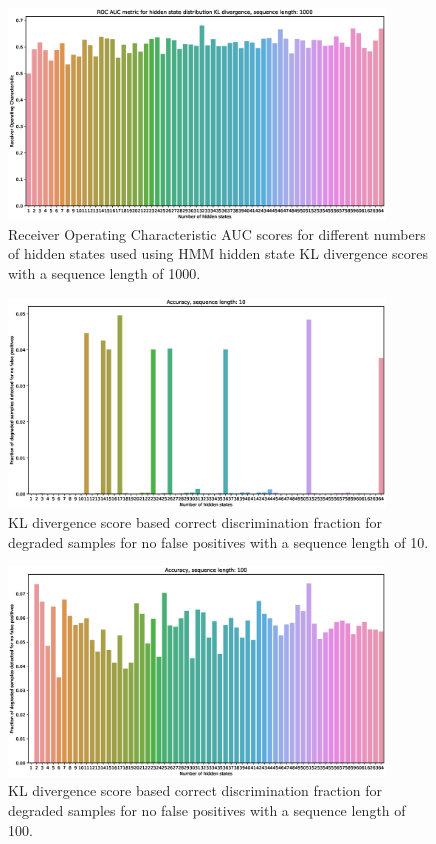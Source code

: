 \documentclass[journal]{IEEEtran}
\begin{document}
\begin{figure}[h]
 \centering
 \includegraphics[width=10cm,keepaspectratio=true]{./roc_kl_score_1000.eps}
 \caption{Receiver Operating Characteristic AUC scores for different numbers of hidden states used using HMM hidden state KL divergence scores with a sequence length of 1000.}
 \label{figure:roc_kl_1000}
\end{figure}

\begin{figure}[h]
 \centering
 \includegraphics[width=10cm,keepaspectratio=true]{./accuracy_10.eps}
 \caption{KL divergence score based correct discrimination fraction for degraded samples for no false positives with a sequence length of 10.}
 \label{figure:discrimination_rate_10}
\end{figure}

\begin{figure}[h]
 \centering
 \includegraphics[width=10cm,keepaspectratio=true]{./accuracy_100.eps}
 \caption{KL divergence score based correct discrimination fraction for degraded samples for no false positives with a sequence length of 100.}
 \label{figure:discrimination_rate_100}
\end{figure}
\end{document}
